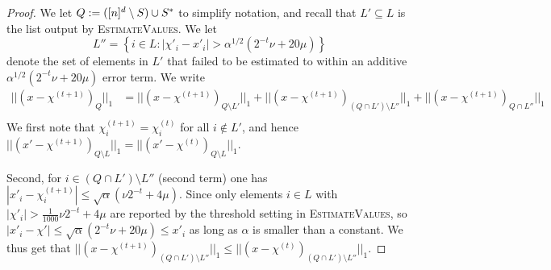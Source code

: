 \begin{proof}

We let $Q:=({[n]^d}\setminus S)\cup S^*$ to simplify notation, and recall that $L'\subseteq L$ is the list output by \textsc{EstimateValues}. We let 
$$
L''=\left\{i\in L: |\chi'_i-x'_i|>\alpha^{1/2}\left(2^{-t}\nu+20\mu\right)\right\}
$$ 
denote the set of elements in $L'$ that failed to be estimated to within an additive $\alpha^{1/2}\left(2^{-t}\nu+20\mu\right)$ error term.
We write
\begin{equation}\label{eq:dfskgj}
\begin{split}
||(x-\chi^{(t+1)})_Q||_1&=||(x-\chi^{(t+1)})_{Q\setminus L'}||_1+||(x-\chi^{(t+1)})_{(Q\cap L')\setminus L''}||_1+||(x-\chi^{(t+1)})_{Q\cap L''}||_1\\
\end{split}
\end{equation}
We first note that $\chi^{(t+1)}_i=\chi^{(t)}_i$ for all $i\not \in L'$, and hence $||(x'-\chi^{(t+1)})_{Q\setminus L}||_1=||(x'-\chi^{(t)})_{Q\setminus L}||_1$.

Second, for $i\in (Q\cap L')\setminus L''$ (second term) one has $|x'_i-\chi_i^{(t+1)}|\leq \sqrt{\alpha}(\nu 2^{-t}+4\mu)$.  Since only elements $i\in L$ with $|\chi'_i|>\frac1{1000}\nu 2^{-t}+4\mu$ are reported by the threshold setting in \textsc{EstimateValues}, so 
$|x'_i-\chi'|\leq \sqrt{\alpha} (2^{-t}\nu+20\mu)\leq x'_i$ as long as $\alpha$ is smaller than a constant.  We thus get that $||(x-\chi^{(t+1)})_{(Q\cap L')\setminus L''}||_1\leq ||(x-\chi^{(t)})_{(Q\cap L')\setminus L''}||_1$.


\end{proof}
